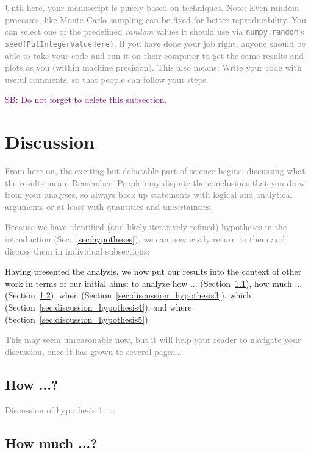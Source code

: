 \documentclass[
  journal=pasa,
  manuscript=Research-Article,
  year=2025,
  volume=X,
]{cup-journal}
\newcommand{\SB}[1]{{\textcolor{purple}{SB: #1}}}
\newcommand{\comment}[1]{\textcolor{gray}{#1}}
\begin{document}
\comment{Until here, your manuscript is purely based on techniques. Note: Even random processes, like Monte Carlo sampling can be fixed for better reproducibility. You can select one of the predefined \textit{random} values it should use via \texttt{numpy.random}'s \texttt{seed(PutIntegerValueHere)}. If you have done your job right, anyone should be able to take your code and run it on their computer to get the same results and plots as you (within machine precision). This also means: Write your code with useful comments, so that people can follow your steps.}

\SB{Do not forget to delete this subsection.}

\clearpage
\section{Discussion} \label{sec:discussion}

\comment{From here on, the exciting but debatable part of science begins: discussing what the results mean. Remember: People may dispute the conclusions that you draw from your analyses, so always back up statements with logical and analytical arguments or at least with quantities and uncertainties.}

\comment{Because we have identified (and likely iteratively refined) hypotheses in the introduction (Sec.~\ref{sec:hypotheses}), we can now easily return to them and discuss them in individual subsections:}

Having presented the analysis, we now put our results into the context of other work in terms of our initial aims: to analyze how ... (Section~\ref{sec:discussion_hypothesis1}), how much ...  (Section~\ref{sec:discussion_hypothesis2}), when (Section~\ref{sec:discussion_hypothesis3}), which (Section~\ref{sec:discussion_hypothesis4}), and where (Section~\ref{sec:discussion_hypothesis5}).

\comment{This may seem unreasonable now, but it will help your reader to navigate your discussion, once it has grown to several pages...}

\subsection{How ...?} \label{sec:discussion_hypothesis1}

\comment{Discussion of hypothesis 1: ...}

\subsection{How much ...?} \label{sec:discussion_hypothesis2}
\end{document}

